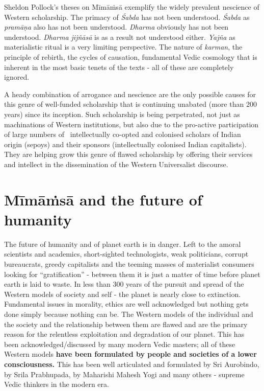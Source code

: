 Sheldon Pollock’s theses on Mīmāṁsā exemplify the widely prevalent nescience of Western scholarship. The primacy of \textit{Śabda} has not been understood. \textit{Śabda} as \textit{pramāṇa} also has not been understood. \textit{Dharma} obviously has not been understood. \textit{Dharma jijñāsā} is as a result not understood either. \textit{Yajña} as materialistic ritual is a very limiting perspective. The nature of \textit{karman}, the principle of rebirth, the cycles of causation, fundamental Vedic cosmology that is inherent in the most basic tenets of the texts - all of these are completely ignored.

A heady combination of arrogance and nescience are the only possible causes for this genre of well-funded scholarship that is continuing unabated (more than 200 years) since its inception. Such scholarship is being perpetrated, not just as machinations of Western institutions, but also due to the pro-active participation of large numbers of  intellectually co-opted and colonised scholars of Indian origin (sepoys) and their sponsors (intellectually colonised Indian capitalists). They are helping grow this genre of flawed scholarship by offering their services and intellect in the dissemination of the Western Universalist discourse. 

\newpage


\section*{Mīmāṁsā and the future of humanity}

\vskip -6pt

The future of humanity and of planet earth is in danger. Left to the amoral scientists and academics, short-sighted technologists, weak politicians, corrupt bureaucrats, greedy capitalists and the teeming masses of materialist consumers looking for “gratification” - between them it is just a matter of time before planet earth is laid to waste. In less than 300 years of the pursuit and spread of the Western models of society and self - the planet is nearly close to extinction. Fundamental issues in morality, ethics are well acknowledged but nothing gets done simply because nothing can be. The Western models of the individual and the society and the relationship between them are flawed and are the primary reason for the relentless exploitation and degradation of our planet. This has been acknowledged/discussed by many modern Vedic masters; all of these Western models \textbf{have been formulated by people and societies of a lower consciousness.} This has been well articulated and formulated by Sri Aurobindo, by Srila Prabhupada, by Maharishi Mahesh Yogi and many others - supreme Vedic thinkers in the modern era.

